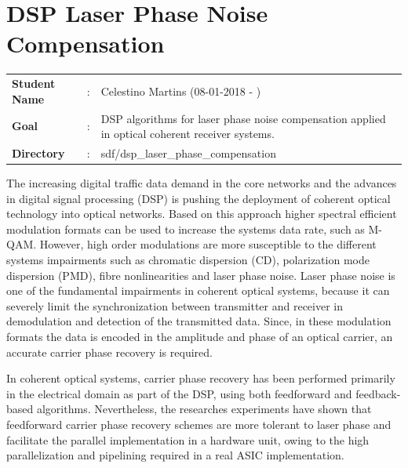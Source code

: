 \clearpage
\section{DSP Laser Phase Noise Compensation}

\begin{refsection}

\begin{tcolorbox}	
\begin{tabular}{p{2.75cm} p{0.2cm} p{10.5cm}} 	
\textbf{Student Name}  &:& Celestino Martins (08-01-2018 - )\\
\textbf{Goal}          &:& DSP algorithms for laser phase noise compensation applied in optical coherent receiver systems.\\
\textbf{Directory}              &:& sdf/dsp\_laser\_phase\_compensation
\end{tabular}
\end{tcolorbox}

The increasing digital traffic data demand in the core networks and the advances in digital signal processing (DSP) is pushing the deployment of coherent optical technology into optical networks. Based on this approach higher spectral efficient modulation formats can be used to increase the systems data rate, such as M-QAM. However, high order modulations are more susceptible to the different systems impairments such as chromatic dispersion (CD),
polarization mode dispersion (PMD), fibre nonlinearities and laser phase noise. Laser phase noise is one of the fundamental impairments in coherent optical systems, because it can severely limit the synchronization between transmitter and receiver in demodulation and detection of the transmitted data.
Since, in these modulation formats the data is encoded in the amplitude and phase of an optical carrier, an accurate carrier phase recovery is required.

In coherent optical systems, carrier phase recovery has been performed primarily in the electrical domain as part of the DSP, using both feedforward and feedback-based algorithms. Nevertheless, the researches experiments have shown that feedforward carrier phase recovery schemes are more tolerant to laser phase and facilitate the parallel implementation in a hardware unit, owing to the high parallelization and pipelining required in a real ASIC implementation.


\end{refsection}
